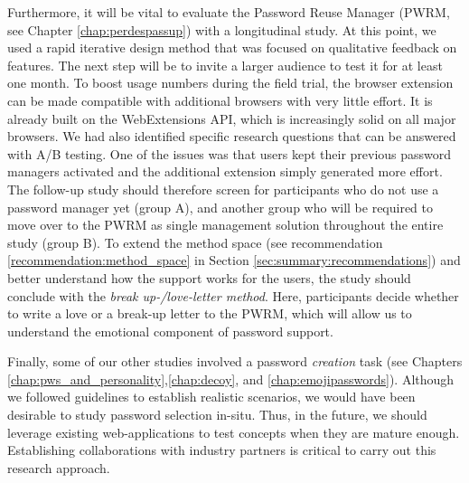 Furthermore, it will be vital to evaluate the Password Reuse Manager (PWRM, see Chapter \ref{chap:perdespassup}) with a longitudinal study. At this point, we used a rapid iterative design method that was focused on qualitative feedback on features. The next step will be to invite a larger audience to test it for at least one month. To boost usage numbers during the field trial, the browser extension can be made compatible with additional browsers with very little effort. It is already built on the WebExtensions API, which is increasingly solid on all major browsers. We had also identified specific research questions that can be answered with A/B testing. One of the issues was that users kept their previous password managers activated and the additional extension simply generated more effort. The follow-up study should therefore screen for participants who do not use a password manager yet (group A), and another group who will be required to move over to the PWRM as single management solution throughout the entire study (group B). To extend the method space (see recommendation \ref{recommendation:method_space} in Section \ref{sec:summary:recommendations}) and better understand how the support works for the users, the study should conclude with the \textit{break up-/love-letter method}. Here, participants decide whether to write a love or a break-up letter to the PWRM, which will allow us to understand the emotional component of password support. 

Finally, some of our other studies involved a password \textit{creation} task (see Chapters \ref{chap:pws_and_personality},\ref{chap:decoy}, and \ref{chap:emojipasswords}). Although we followed guidelines to establish realistic scenarios, we would have been desirable to study password selection in-situ. Thus, in the future, we should leverage existing web-applications to test concepts when they are mature enough. Establishing collaborations with industry partners is critical to carry out this research approach. 

